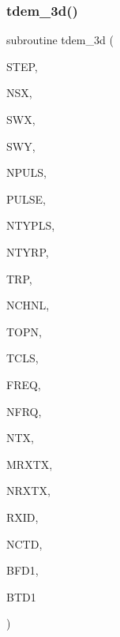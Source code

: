 \subsubsection{\texorpdfstring{tdem\+\_\+3d()}{tdem\_3d()}}
{\footnotesize\ttfamily subroutine tdem\+\_\+3d (\begin{DoxyParamCaption}\item[{integer}]{S\+T\+EP,  }\item[{integer}]{N\+SX,  }\item[{real, dimension(nsx)}]{S\+WX,  }\item[{real, dimension(nsx,3)}]{S\+WY,  }\item[{integer}]{N\+P\+U\+LS,  }\item[{real}]{P\+U\+L\+SE,  }\item[{integer}]{N\+T\+Y\+P\+LS,  }\item[{integer}]{N\+T\+Y\+RP,  }\item[{real, dimension(ntyrp)}]{T\+RP,  }\item[{integer}]{N\+C\+H\+NL,  }\item[{real, dimension(nchnl)}]{T\+O\+PN,  }\item[{real, dimension(nchnl)}]{T\+C\+LS,  }\item[{real, dimension(nfrq)}]{F\+R\+EQ,  }\item[{integer}]{N\+F\+RQ,  }\item[{integer}]{N\+TX,  }\item[{integer}]{M\+R\+X\+TX,  }\item[{integer, dimension(ntx)}]{N\+R\+X\+TX,  }\item[{integer, dimension(mrxtx,ntx)}]{R\+X\+ID,  }\item[{integer, dimension(mrxtx,ntx)}]{N\+C\+TD,  }\item[{complex, dimension(nfrq,mrxtx,ntx,3)}]{B\+F\+D1,  }\item[{real, dimension(nchnl,mrxtx,ntx,3)}]{B\+T\+D1 }\end{DoxyParamCaption})}

